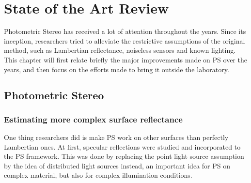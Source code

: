 
\chapter{State of the Art Review}
\label{c:sota}


Photometric Stereo has received a lot of attention throughout the years. Since its inception, researchers tried to alleviate the restrictive assumptions of the original method, such as Lambertian reflectance, noiseless sensors and known lighting. This chapter will first relate briefly the major improvements made on PS over the years, and then focus on the efforts made to bring it outside the laboratory.


\section{Photometric Stereo}


\subsection{Estimating more complex surface reflectance}
One thing researchers did is make PS work on other surfaces than perfectly Lambertian ones. At first, specular reflections \cite{Ikeuchi1981} were studied and incorporated to the PS framework. This was done by replacing the point light source assumption by the idea of distributed light sources instead, an important idea for PS on complex material, but also for complex illumination conditions.

